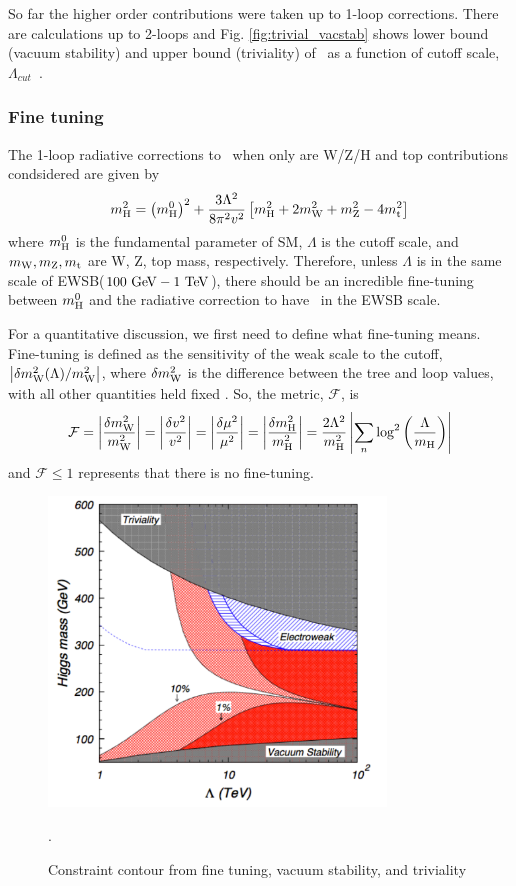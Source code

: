 So far the higher order contributions were taken up to 1-loop corrections. 
There are calculations up to 2-loops and Fig. \ref{fig:trivial_vacstab} 
shows lower bound (vacuum stability) and upper bound (triviality) of \mHi\ 
as a function of cutoff scale, $\Lambda_{cut}$~\cite{}.

%
\subsubsection{Fine tuning}
The 1-loop radiative corrections to \mHi\ when only are W/Z/H and top contributions 
condsidered are given by \cite{Djouadi20081}
\begin{eqnarray} 
m_{\mathrm{H}}^2 
= 
\left( m_{\mathrm{H}}^0 \right)^2 + \frac{3 \Lambda^2}{8\pi^2v^2} 
\left[ m_{\mathrm{H}}^2 + 2m_{\mathrm{W}}^2 + m_{\mathrm{Z}}^2- 4 m_{\mathrm{t}}^2 \right] 
\end{eqnarray} 
where $m_{\mathrm{H}}^0$ is the fundamental parameter of SM, $\Lambda$ is the 
cutoff scale, and $m_{\mathrm{W}}, m_{\mathrm{Z}}, m_{\mathrm{t}}$ are W, Z, top mass, respectively. 
Therefore, unless $\Lambda$ is in the same scale of 
EWSB($100~\mathrm{Ge\kern -0.1em V} - 1~\mathrm{Te\kern -0.1em V}$), there should be an incredible fine-tuning between 
$m_{\mathrm{H}}^0$ and the radiative correction to have \mHi\ in the EWSB scale.  

For a quantitative discussion, we first need to define what fine-tuning means. 
Fine-tuning is defined as the sensitivity of the weak scale to
the cutoff, $\left| \delta m_{\mathrm{W}}^2(\Lambda) / m_{\mathrm{W}}^2 \right|$, where $\delta m_{\mathrm{W}}^2$ is the 
difference between the tree and loop values, with all other quantities held fixed 
\cite{Kolda:2000wi}.
So, the metric, $\mathcal{F}$, is  
\begin{eqnarray} 
\mathcal{F}
= \left| \frac{\delta m_{\mathrm{W}}^2}{m_{\mathrm{W}}^2} \right|
= \left| \frac{\delta v^2}{v^2} \right|
= \left| \frac{\delta \mu^2}{\mu^2} \right|
= \left| \frac{\delta m_{\mathrm{H}}^2}{m_{\mathrm{H}}^2} \right|
= \frac{2\Lambda^2}{m_{\mathrm{H}}^2} \left| \sum_{n} 
  \log^2\left( \frac{\Lambda}{m_{\mathrm{H}}} \right) \right| 
\end{eqnarray} 
and $\mathcal{F} \le 1$ represents that there is no fine-tuning. 

\begin{figure}[t]
\centering
\includegraphics[width=0.8\textwidth]{figures/finetuning.pdf}
\caption{Constraint contour from fine tuning, vacuum stability, and triviality}.
\label{fig:finetuning}
\end{figure}

